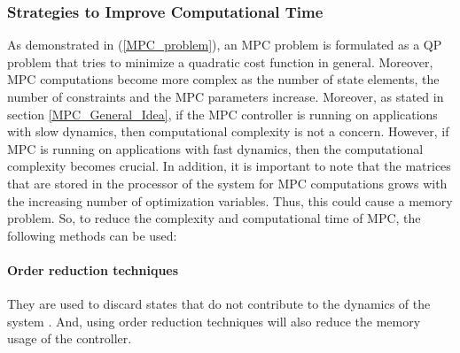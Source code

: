 \documentclass{thesisreport}
\begin{document}
\subsubsection{Strategies to Improve Computational Time}

As demonstrated in (\ref{MPC_problem}), an MPC problem is formulated as a QP problem that tries to minimize a quadratic cost function in general. Moreover, MPC computations become more complex as the number of state elements, the number of constraints and the MPC parameters increase. Moreover, as stated in section \ref{MPC_General_Idea}, if the MPC controller is running on applications with slow dynamics, then computational complexity is not a concern. However, if MPC is running on applications with fast dynamics, then the computational complexity becomes crucial. In addition, it is important to note that the matrices that are stored in the processor of the system for MPC computations grows with the increasing number of optimization variables. Thus, this could cause a memory problem. So, to reduce the complexity and computational time of MPC, the following methods can be used:

\paragraph{Order reduction techniques} They are used to discard states that do not contribute to the dynamics of the system \cite{4421358}. And, using order reduction techniques will also reduce the memory usage of the controller.

\end{document}
